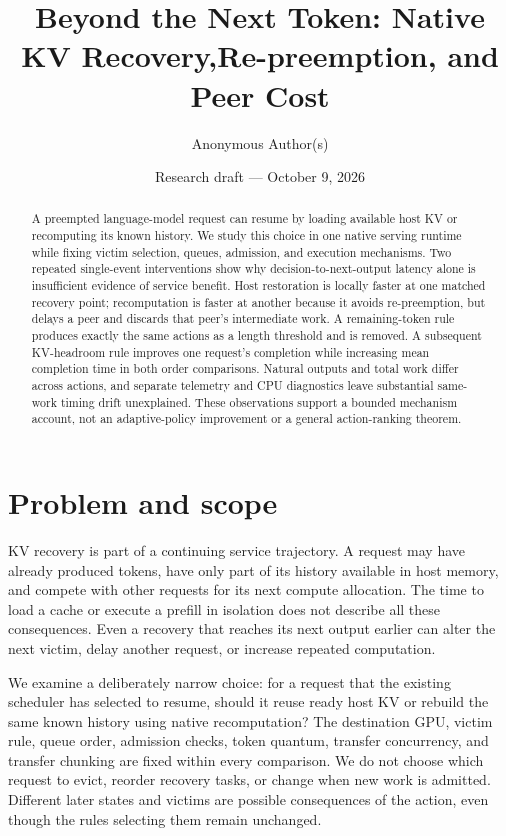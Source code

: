 \documentclass[10pt,a4paper]{article}
\title{Beyond the Next Token: Native KV Recovery,\newline Re-preemption, and Peer Cost}
\author{Anonymous Author(s)}
\date{Research draft --- October 9, 2026}
\begin{document}
\maketitle
\begin{abstract}
A preempted language-model request can resume by loading available host KV or
recomputing its known history. We study this choice in one native serving
runtime while fixing victim selection, queues, admission, and execution
mechanisms. Two repeated single-event interventions show why decision-to-next-output
latency alone is insufficient evidence of service benefit. Host restoration is
locally faster at one matched recovery point; recomputation is faster at another
because it avoids re-preemption, but delays a peer and discards that peer's
intermediate work. A remaining-token rule produces exactly the same actions as
a length threshold and is removed. A subsequent KV-headroom rule improves one
request's completion while increasing mean completion time in both order
comparisons. Natural outputs and total work differ across actions, and separate
telemetry and CPU diagnostics leave substantial same-work timing drift
unexplained. These observations support a bounded mechanism account, not an
adaptive-policy improvement or a general action-ranking theorem.
\end{abstract}

\section{Problem and scope}
KV recovery is part of a continuing service trajectory. A request may have
already produced tokens, have only part of its history available in host memory,
and compete with other requests for its next compute allocation. The time to
load a cache or execute a prefill in isolation does not describe all these
consequences. Even a recovery that reaches its next output earlier can alter the
next victim, delay another request, or increase repeated computation.

We examine a deliberately narrow choice: for a request that the existing
scheduler has selected to resume, should it reuse ready host KV or rebuild the
same known history using native recomputation? The destination GPU, victim
rule, queue order, admission checks, token quantum, transfer concurrency, and
transfer chunking are fixed within every comparison. We do not choose which
request to evict, reorder recovery tasks, or change when new work is admitted.
Different later states and victims are possible consequences of the action,
even though the rules selecting them remain unchanged.
\end{document}
